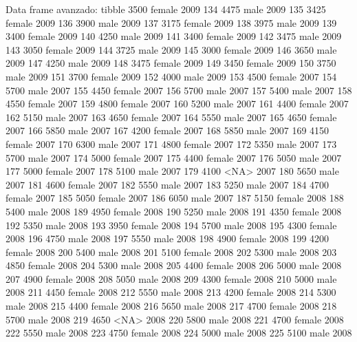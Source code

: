 \documentclass[
  ignorenonframetext,
  aspectratio=169]{beamer}
\let\oldverbatim\verbatim
\let\endoldverbatim\endverbatim
\renewenvironment{verbatim}{\tiny\oldverbatim}{\endoldverbatim}
\begin{document}
\begin{frame}[fragile]{Data frame avanzado: tibble}
\begin{verbatim}
133        3500 female 2009
134        4475   male 2009
135        3425 female 2009
136        3900   male 2009
137        3175 female 2009
138        3975   male 2009
139        3400 female 2009
140        4250   male 2009
141        3400 female 2009
142        3475   male 2009
143        3050 female 2009
144        3725   male 2009
145        3000 female 2009
146        3650   male 2009
147        4250   male 2009
148        3475 female 2009
149        3450 female 2009
150        3750   male 2009
151        3700 female 2009
152        4000   male 2009
153        4500 female 2007
154        5700   male 2007
155        4450 female 2007
156        5700   male 2007
157        5400   male 2007
158        4550 female 2007
159        4800 female 2007
160        5200   male 2007
161        4400 female 2007
162        5150   male 2007
163        4650 female 2007
164        5550   male 2007
165        4650 female 2007
166        5850   male 2007
167        4200 female 2007
168        5850   male 2007
169        4150 female 2007
170        6300   male 2007
171        4800 female 2007
172        5350   male 2007
173        5700   male 2007
174        5000 female 2007
175        4400 female 2007
176        5050   male 2007
177        5000 female 2007
178        5100   male 2007
179        4100   <NA> 2007
180        5650   male 2007
181        4600 female 2007
182        5550   male 2007
183        5250   male 2007
184        4700 female 2007
185        5050 female 2007
186        6050   male 2007
187        5150 female 2008
188        5400   male 2008
189        4950 female 2008
190        5250   male 2008
191        4350 female 2008
192        5350   male 2008
193        3950 female 2008
194        5700   male 2008
195        4300 female 2008
196        4750   male 2008
197        5550   male 2008
198        4900 female 2008
199        4200 female 2008
200        5400   male 2008
201        5100 female 2008
202        5300   male 2008
203        4850 female 2008
204        5300   male 2008
205        4400 female 2008
206        5000   male 2008
207        4900 female 2008
208        5050   male 2008
209        4300 female 2008
210        5000   male 2008
211        4450 female 2008
212        5550   male 2008
213        4200 female 2008
214        5300   male 2008
215        4400 female 2008
216        5650   male 2008
217        4700 female 2008
218        5700   male 2008
219        4650   <NA> 2008
220        5800   male 2008
221        4700 female 2008
222        5550   male 2008
223        4750 female 2008
224        5000   male 2008
225        5100   male 2008

\end{verbatim}
\end{frame}
\end{document}
